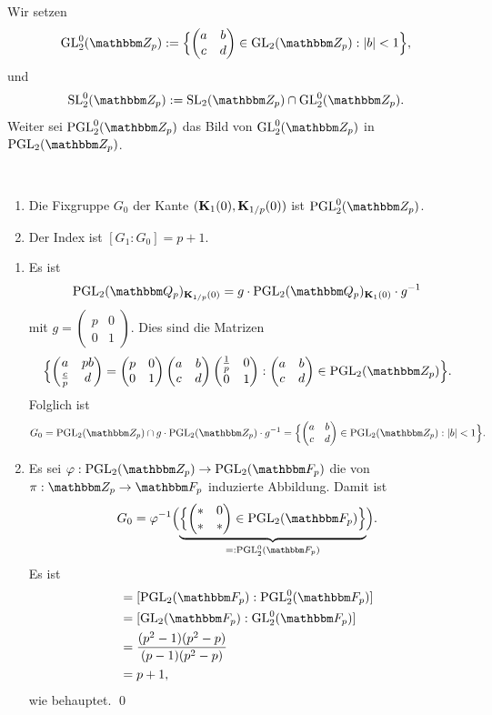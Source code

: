 \documentclass[a4paper, 12pt, twoside]{article}
\begin{document}
\DEF Wir setzen
\[
\GL_2^0(\ZZ_p) :=
\Bigl\{
\begin{pmatrix}
a & b \\
c & d
\end{pmatrix}\in\GL_2(\ZZ_p) : |b|<1
\Bigr\},
\]
und 
\[
\SL_2^0(\ZZ_p):=\SL_2(\ZZ_p)\cap\GL_2^0(\ZZ_p).
\]
Weiter sei $\PGL_2^0(\ZZ_p)$ das Bild von $\GL_2^0(\ZZ_p)$
in $\PGL_2(\ZZ_p)$.

\FOLG\ \begin{enumerate}
\item Die Fixgruppe $G_0$ der Kante $(\mathbf{K}_1(0),\mathbf{K}_{1/p}(0))$
ist $\PGL_2^0(\ZZ_p)$.
\item Der Index ist $[G_1:G_0]=p+1$.
\end{enumerate}
\bew \begin{enumerate}
\item Es ist
\[
\PGL_2(\QQ_p)_{\KU_{1/p}(0)}
=g\cdot\PGL_2(\QQ_p)_{\KU_1(0)}\cdot g^{-1}
\]
mit $g=\begin{pmatrix}
p & 0 \\
0 & 1
\end{pmatrix}$.
Dies sind die Matrizen
\[
\Bigl\{
\begin{pmatrix}
a & pb \\
\frac{c}{p} & d
\end{pmatrix}
=
\begin{pmatrix}
p & 0 \\
0 & 1
\end{pmatrix}
\begin{pmatrix}
a & b \\
c & d
\end{pmatrix}
\begin{pmatrix}
\frac{1}{p} & 0 \\
0 & 1
\end{pmatrix}
:
\begin{pmatrix}
a & b \\
c & d
\end{pmatrix}\in\PGL_2(\ZZ_p)
\Bigr\}.
\]
Folglich ist
\[
G_0 = \PGL_2(\ZZ_p) \cap g\cdot\PGL_2(\ZZ_p)\cdot g^{-1}
=
\Bigl\{
\begin{pmatrix}
a & b \\
c & d
\end{pmatrix}\in\PGL_2(\ZZ_p):|b|<1
\Bigr\}.
\]
\item Es sei $\phi:\PGL_2(\ZZ_p)\Ra\PGL_2(\FF_p)$ die von
$\pi:\ZZ_p\Ra\FF_p$ induzierte Abbildung. Damit ist
\[
G_0=\phi^{-1}\Bigl(
\ub{\Bigl\{
\begin{pmatrix}
* & 0 \\
* & *
\end{pmatrix}
\in\PGL_2(\FF_p)
\Bigr\}}{=:\PGL_2^0(\FF_p)}
\Bigr).
\]
Es ist
\begin{align*}
[G_1:G_0] &= [\PGL_2(\FF_p):\PGL_2^0(\FF_p)] \\
&= [\GL_2(\FF_p):\GL_2^0(\FF_p)] \\
&=\frac{(p^2-1)(p^2-p)}{(p-1)(p^2-p)} \\
&=p+1,
\end{align*}
wie behauptet.
\qed
\end{enumerate}
\end{document}
